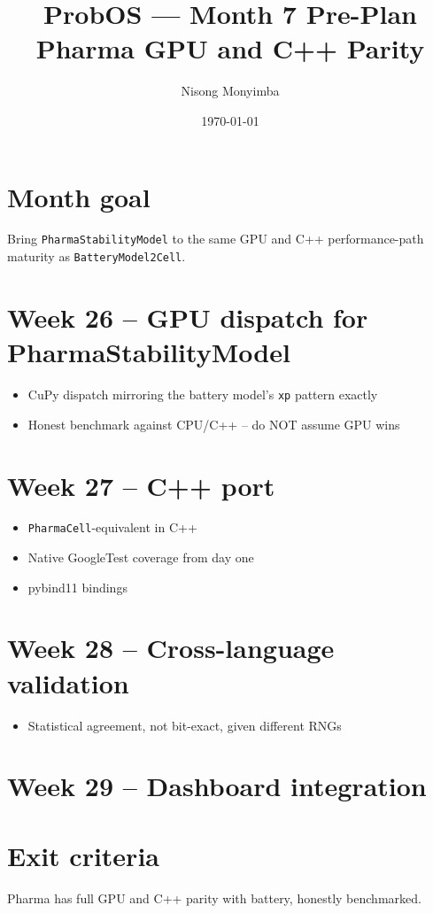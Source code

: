 \documentclass[11pt]{article}
\title{ProbOS --- Month 7 Pre-Plan\\Pharma GPU and C++ Parity}
\author{Nisong Monyimba}
\date{\today}
\begin{document}
\maketitle

\section*{Month goal}
Bring \texttt{PharmaStabilityModel} to the same GPU and C++
performance-path maturity as \texttt{BatteryModel2Cell}.

\section*{Week 26 -- GPU dispatch for PharmaStabilityModel}
\begin{itemize}[leftmargin=*]
  \item CuPy dispatch mirroring the battery model's \texttt{xp}
    pattern exactly
  \item Honest benchmark against CPU/C++ -- do NOT assume GPU wins
\end{itemize}

\section*{Week 27 -- C++ port}
\begin{itemize}[leftmargin=*]
  \item \texttt{PharmaCell}-equivalent in C++
  \item Native GoogleTest coverage from day one
  \item pybind11 bindings
\end{itemize}

\section*{Week 28 -- Cross-language validation}
\begin{itemize}[leftmargin=*]
  \item Statistical agreement, not bit-exact, given different RNGs
\end{itemize}

\section*{Week 29 -- Dashboard integration}

\section*{Exit criteria}
Pharma has full GPU and C++ parity with battery, honestly benchmarked.
\end{document}

